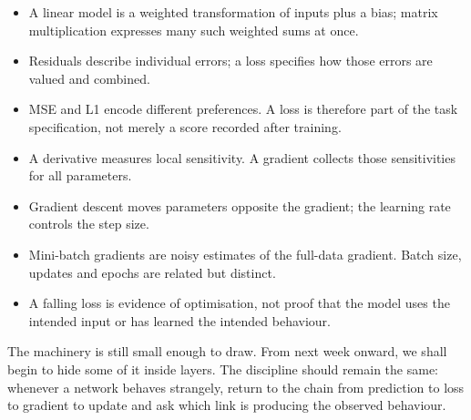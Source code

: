 \begin{itemize}[leftmargin=*]
  \item A linear model is a weighted transformation of inputs plus a bias; matrix multiplication expresses many such weighted sums at once.
  \item Residuals describe individual errors; a loss specifies how those errors are valued and combined.
  \item MSE and L1 encode different preferences. A loss is therefore part of the task specification, not merely a score recorded after training.
  \item A derivative measures local sensitivity. A gradient collects those sensitivities for all parameters.
  \item Gradient descent moves parameters opposite the gradient; the learning rate controls the step size.
  \item Mini-batch gradients are noisy estimates of the full-data gradient. Batch size, updates and epochs are related but distinct.
  \item A falling loss is evidence of optimisation, not proof that the model uses the intended input or has learned the intended behaviour.
\end{itemize}

The machinery is still small enough to draw. From next week onward, we shall begin to hide some of it inside layers. The discipline should remain the same: whenever a network behaves strangely, return to the chain from prediction to loss to gradient to update and ask which link is producing the observed behaviour.
